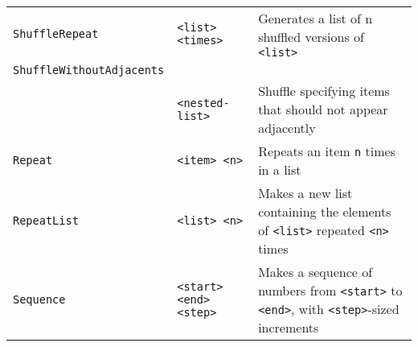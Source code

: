 \begin{longtable}{p{3cm}p{3cm}p{6cm}}
\verb+ShuffleRepeat+&\verb+<list>+ \verb+<times>+&Generates a list of {{{n}}} shuffled versions of \verb+<list>+\\
\verb+ShuffleWithoutAdjacents+\\
&\verb+<nested-list>+&Shuffle specifying items that should not appear adjacently\\
\verb+Repeat+ & \verb+<item> <n>+& Repeats an item \verb+n+ times in a list\\ 
\verb+RepeatList+ & \verb+<list> <n>+ & Makes a new list containing 
the elements of \verb+<list>+ repeated \verb+<n>+ times\\ 
\verb+Sequence+ & \verb+<start>+ \verb+<end>+ \verb+<step>+ & Makes a sequence of numbers 
from \verb+<start>+ to \verb+<end>+, with \verb+<step>+-sized increments\\ 


\end{longtable}
